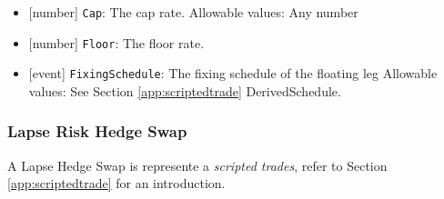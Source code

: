 \begin{itemize}
\item{}[number] \lstinline!Cap!: The cap rate.
  Allowable values: Any number
  \item{}[number] \lstinline!Floor!: The floor rate.
\item{}[event] \lstinline!FixingSchedule!: The fixing schedule of the floating leg
  Allowable values: See Section \ref{app:scriptedtrade} DerivedSchedule.
\end{itemize}

\subsubsection{Lapse Risk Hedge Swap}
 

A  Lapse Hedge Swap is represente a {\em scripted trades}, refer to Section
\ref{app:scriptedtrade} for an introduction.
 
